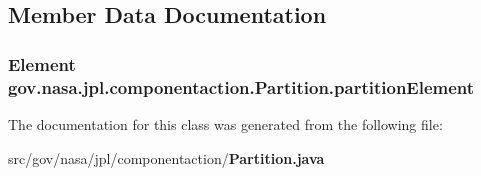 \subsection{Member Data Documentation}
\subsubsection[{partition\+Element}]{\setlength{\rightskip}{0pt plus 5cm}Element gov.\+nasa.\+jpl.\+componentaction.\+Partition.\+partition\+Element\hspace{0.3cm}{\ttfamily [private]}}\label{classgov_1_1nasa_1_1jpl_1_1componentaction_1_1_partition_af33377ad64cd86b18605c25d0988851e}


The documentation for this class was generated from the following file\+:\begin{DoxyCompactItemize}
\item 
src/gov/nasa/jpl/componentaction/{\bf Partition.\+java}\end{DoxyCompactItemize}
